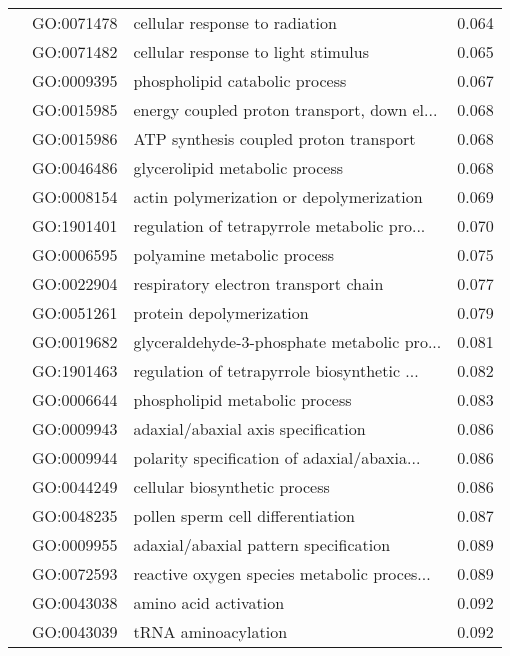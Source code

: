 \begin{longtable}{lllr}
   & GO:0071478 &               cellular response to radiation &         0.064 \\
   & GO:0071482 &          cellular response to light stimulus &         0.065 \\
   & GO:0009395 &               phospholipid catabolic process &         0.067 \\
   & GO:0015985 &  energy coupled proton transport, down el... &         0.068 \\
   & GO:0015986 &       ATP synthesis coupled proton transport &         0.068 \\
   & GO:0046486 &               glycerolipid metabolic process &         0.068 \\
   & GO:0008154 &     actin polymerization or depolymerization &         0.069 \\
   & GO:1901401 &  regulation of tetrapyrrole metabolic pro... &         0.070 \\
   & GO:0006595 &                  polyamine metabolic process &         0.075 \\
   & GO:0022904 &         respiratory electron transport chain &         0.077 \\
   & GO:0051261 &                     protein depolymerization &         0.079 \\
   & GO:0019682 &  glyceraldehyde-3-phosphate metabolic pro... &         0.081 \\
   & GO:1901463 &  regulation of tetrapyrrole biosynthetic ... &         0.082 \\
   & GO:0006644 &               phospholipid metabolic process &         0.083 \\
   & GO:0009943 &           adaxial/abaxial axis specification &         0.086 \\
   & GO:0009944 &  polarity specification of adaxial/abaxia... &         0.086 \\
   & GO:0044249 &                cellular biosynthetic process &         0.086 \\
   & GO:0048235 &            pollen sperm cell differentiation &         0.087 \\
   & GO:0009955 &        adaxial/abaxial pattern specification &         0.089 \\
   & GO:0072593 &  reactive oxygen species metabolic proces... &         0.089 \\
   & GO:0043038 &                        amino acid activation &         0.092 \\
   & GO:0043039 &                          tRNA aminoacylation &         0.092 \\

\end{longtable}
